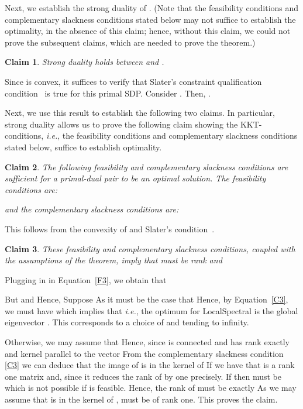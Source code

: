 \documentclass[11pt]{article}
\newtheorem{claim}{Claim}
\newenvironment{proof}{\noindent {\em Proof:}}{\\\hspace*{\fill}\mbox{}}
\begin{document}
\noindent
Next, we establish the strong duality of .
(Note that the feasibility conditions and
complementary slackness conditions
stated below
may not suffice to 
establish the optimality, in the absence of this claim; 
hence, without this claim, we could not prove the subsequent claims, which 
are needed to prove the theorem.)

\begin{claim}
Strong duality holds between  and .
\end{claim}
\begin{proof} Since  is convex, it suffices to verify that Slater's 
constraint qualification condition~\cite{Boyd04} is true for this primal SDP.
Consider .  
Then, .
\end{proof}

\noindent
Next, we use this result to establish the following two claims.
In particular, strong duality allows us to prove the following claim showing 
the KKT-conditions, \emph{i.e.}, the feasibility conditions and 
complementary slackness conditions stated below, suffice to establish
 optimality.

\begin{claim}   The following feasibility and complementary slackness conditions are 
sufficient for a primal-dual pair 
 to be an optimal solution.
The feasibility conditions are:

and the complementary slackness conditions are:

\end{claim}
\begin{proof}
This follows from the convexity of  and Slater's 
condition~\cite{Boyd04}.
\end{proof}


\begin{claim}
\label{claim:rankone}
These feasibility and complementary slackness conditions, coupled with the 
assumptions of the theorem, imply that   must be 
rank  and 
\end{claim}
\begin{proof}  Plugging in  in Equation~\eqref{F3}, we obtain that 

But  and  Hence,  
Suppose  As  it must be the case that  Hence, by Equation~\eqref{C3}, we must have  which implies that  {\em i.e.},  the optimum for \textsf{LocalSpectral} is the global eigenvector . This corresponds to a choice of  and  tending to infinity.

Otherwise, we may assume that  Hence, since  is connected and   has rank exactly  and kernel parallel to the vector  
From the complementary slackness condition \eqref{C3} we can deduce that the image of  is in the kernel of  
If  we have that  is a rank one matrix and, since  it reduces the rank of  by one precisely. If  then  must be  which is not possible  if  is feasible.
Hence, the rank of  must be exactly  As we may assume that  is in the kernel of ,  must be of rank one. 
This proves the claim. 
\end{proof}
\end{document}
